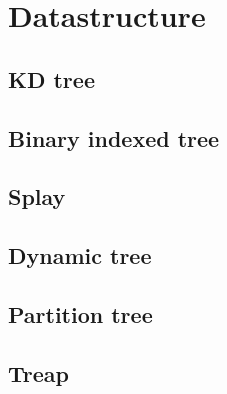 \section{Datastructure}
\subsection{KD tree}


\subsection{Binary indexed tree}


\subsection{Splay}


\subsection{Dynamic tree}


\subsection{Partition tree}


\subsection{Treap}
